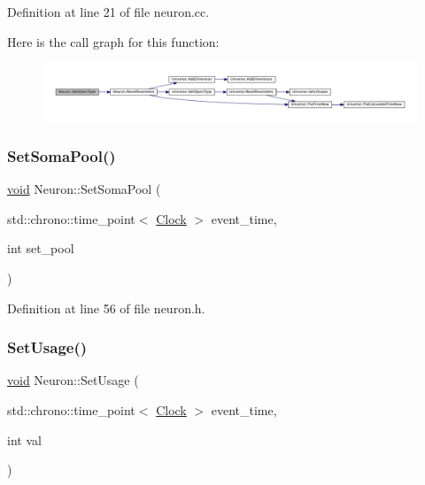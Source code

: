 Definition at line 21 of file neuron.\+cc.

Here is the call graph for this function\+:\nopagebreak
\begin{figure}[H]
\begin{center}
\leavevmode
\includegraphics[width=350pt]{class_neuron_ab371e2dacf2cdde8db5547b72fb45ca1_cgraph}
\end{center}
\end{figure}
\mbox{\label{class_neuron_ae18e23983d02953fa6886bef0bbeb339}} 
\subsubsection{\texorpdfstring{Set\+Soma\+Pool()}{SetSomaPool()}}
{\footnotesize\ttfamily \mbox{\hyperlink{glad_8h_a950fc91edb4504f62f1c577bf4727c29}{void}} Neuron\+::\+Set\+Soma\+Pool (\begin{DoxyParamCaption}\item[{std\+::chrono\+::time\+\_\+point$<$ \mbox{\hyperlink{universe_8h_a0ef8d951d1ca5ab3cfaf7ab4c7a6fd80}{Clock}} $>$}]{event\+\_\+time,  }\item[{int}]{set\+\_\+pool }\end{DoxyParamCaption})\hspace{0.3cm}{\ttfamily [inline]}}



Definition at line 56 of file neuron.\+h.

\mbox{\label{class_neuron_abf99856ac41b5c9c4948b3204bbc1590}} 
\subsubsection{\texorpdfstring{Set\+Usage()}{SetUsage()}}
{\footnotesize\ttfamily \mbox{\hyperlink{glad_8h_a950fc91edb4504f62f1c577bf4727c29}{void}} Neuron\+::\+Set\+Usage (\begin{DoxyParamCaption}\item[{std\+::chrono\+::time\+\_\+point$<$ \mbox{\hyperlink{universe_8h_a0ef8d951d1ca5ab3cfaf7ab4c7a6fd80}{Clock}} $>$}]{event\+\_\+time,  }\item[{int}]{val }\end{DoxyParamCaption})\hspace{0.3cm}{\ttfamily [inline]}}



